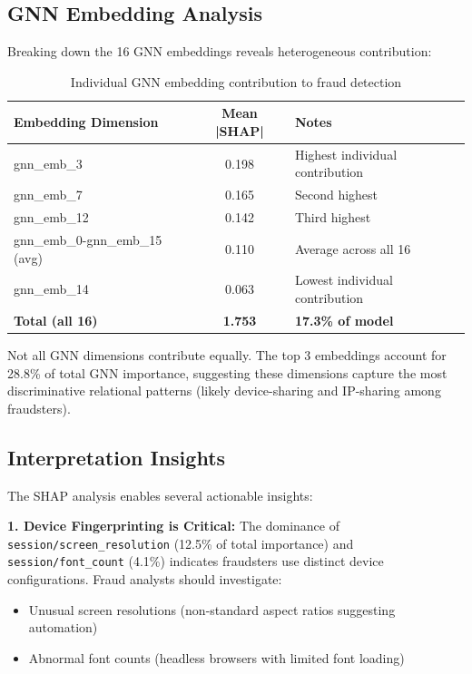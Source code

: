 \subsection{GNN Embedding Analysis}

Breaking down the 16 GNN embeddings reveals heterogeneous contribution:

\begin{table}[h]
\centering
\caption{Individual GNN embedding contribution to fraud detection}
\begin{tabular}{lcl}
\hline
\textbf{Embedding Dimension} & \textbf{Mean |SHAP|} & \textbf{Notes} \\
\hline
gnn\_emb\_3 & 0.198 & Highest individual contribution \\
gnn\_emb\_7 & 0.165 & Second highest \\
gnn\_emb\_12 & 0.142 & Third highest \\
gnn\_emb\_0-gnn\_emb\_15 (avg) & 0.110 & Average across all 16 \\
gnn\_emb\_14 & 0.063 & Lowest individual contribution \\
\hline
\textbf{Total (all 16)} & \textbf{1.753} & \textbf{17.3\% of model} \\
\hline
\end{tabular}
\end{table}

Not all GNN dimensions contribute equally. The top 3 embeddings account for 28.8\% of total GNN importance, suggesting these dimensions capture the most discriminative relational patterns (likely device-sharing and IP-sharing among fraudsters).

\subsection{Interpretation Insights}

The SHAP analysis enables several actionable insights:

\textbf{1. Device Fingerprinting is Critical:} The dominance of \texttt{session/screen\_resolution} (12.5\% of total importance) and \texttt{session/font\_count} (4.1\%) indicates fraudsters use distinct device configurations. Fraud analysts should investigate:
\begin{itemize}
    \item Unusual screen resolutions (non-standard aspect ratios suggesting automation)
    \item Abnormal font counts (headless browsers with limited font loading)
\end{itemize}

